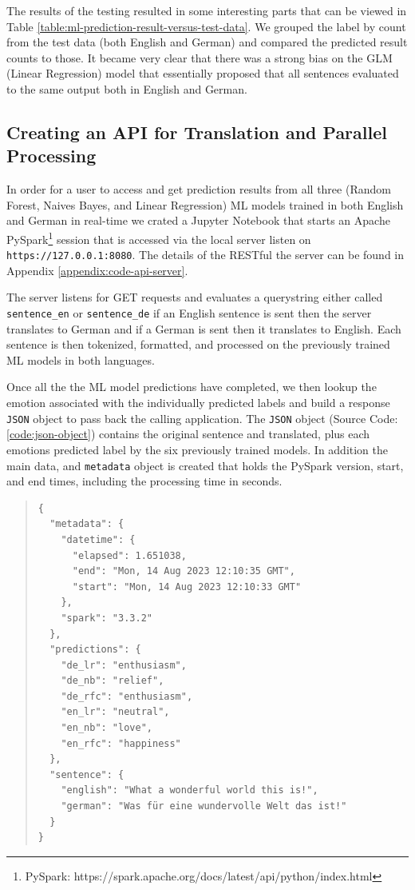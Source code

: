 \documentclass[11pt]{article}
\newenvironment{code}{\captionsetup{type=listing}}{}
\begin{document}
The results of the testing resulted in some interesting parts that can be viewed in Table \ref{table:ml-prediction-result-versus-test-data}. We grouped the label by count from the test data (both English and German) and compared the predicted result counts to those. It became very clear that there was a strong bias on the GLM (Linear Regression) model that essentially proposed that all sentences evaluated to the same output both in English and German. 

\subsection{Creating an API for Translation and Parallel Processing}
\label{sec:create-api-for-translation-and-parallel-processing}

In order for a user to access and get prediction results from all three (Random Forest, Naives Bayes, and Linear Regression) ML models trained in both English and German in real-time we crated a Jupyter Notebook that starts an Apache PySpark\footnote{PySpark: https://spark.apache.org/docs/latest/api/python/index.html} session that is accessed via the local server listen on \texttt{https://127.0.0.1:8080}. The details of the RESTful the server can be found in Appendix \ref{appendix:code-api-server}.

The server listens for GET requests and evaluates a querystring either called \texttt{sentence\_en} or \texttt{sentence\_de} if an English sentence is sent then the server translates to German and if a German is sent then it translates to English. Each sentence is then tokenized, formatted, and processed on the previously trained ML models in both languages.

Once all the the ML model predictions have completed, we then lookup the emotion associated with the individually predicted labels and build a response \texttt{JSON} object to pass back the calling application. The \texttt{JSON} object (Source Code: \ref{code:json-object}) contains the original sentence and translated, plus each emotions predicted label by the six previously trained models. In addition the main data, and \texttt{metadata} object is created that holds the PySpark version, start, and end times, including the processing time in seconds.

\begin{code}
\begin{quote}
\begin{verbatim}
{
  "metadata": {
    "datetime": {
      "elapsed": 1.651038,
      "end": "Mon, 14 Aug 2023 12:10:35 GMT",
      "start": "Mon, 14 Aug 2023 12:10:33 GMT"
    },
    "spark": "3.3.2"
  },
  "predictions": {
    "de_lr": "enthusiasm",
    "de_nb": "relief",
    "de_rfc": "enthusiasm",
    "en_lr": "neutral",
    "en_nb": "love",
    "en_rfc": "happiness"
  },
  "sentence": {
    "english": "What a wonderful world this is!",
    "german": "Was für eine wundervolle Welt das ist!"
  }
}
\end{verbatim}
\label{code:json-object}
\end{quote}
\end{code}
\end{document}
